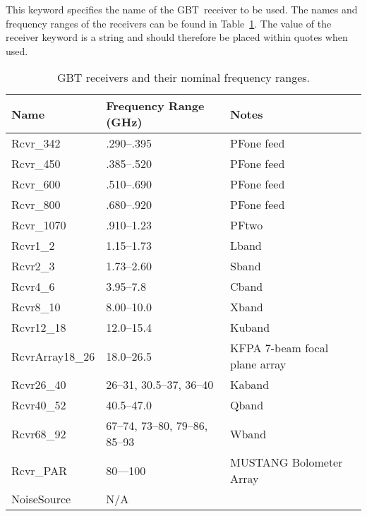\begin{description}[leftmargin=*,font=\bfseries\large]

\item[receiver] This keyword specifies the  name of the \gls{GBT}\ receiver to be used.
The names and frequency ranges of the receivers can be found in Table~\ref{table:rx}.
The value of the receiver keyword is a string and should therefore be placed within
quotes when used.

\begin{table}[!h]
\begin{center}
\setlength{\abovecaptionskip}{0pt}\setlength{\belowcaptionskip}{0pt}
\caption[GBT receivers and frequencies]
{\gls{GBT} receivers and their nominal frequency ranges.
\label{table:rx}}
\begin{tabular}{lll}
\toprule
Name    & Frequency Range (GHz) & Notes             \\
\midrule
Rcvr\_342       &   .290--.395  & \gls{PFone} feed\\
Rcvr\_450       &   .385--.520  & \gls{PFone} feed\\
Rcvr\_600       &   .510--.690  & \gls{PFone} feed\\
\midrule
Rcvr\_800       &   .680--.920  & \gls{PFone} feed\\
Rcvr\_1070      &   .910--1.23  & \gls{PFtwo}         \\
Rcvr1\_2        &   1.15--1.73  & \gls{Lband}       \\
\midrule
Rcvr2\_3        &   1.73--2.60  & \gls{Sband}       \\
Rcvr4\_6        &   3.95--7.8   & \gls{Cband}       \\
Rcvr8\_10       &   8.00--10.0  & \gls{Xband}       \\
\midrule
Rcvr12\_18      &   12.0--15.4  & \gls{Kuband}      \\
RcvrArray18\_26 & 18.0--26.5    & \gls{KFPA} 7-beam focal plane array \\
Rcvr26\_40      &  26--31, 30.5--37, 36--40 & \gls{Kaband} \\
\midrule
Rcvr40\_52      &   40.5--47.0  & \gls{Qband} \\
Rcvr68\_92      & 67--74, 73--80, 79--86, 85--93 & \gls{Wband} \\
Rcvr\_PAR       & 80---100 & \gls{MUSTANG} Bolometer Array\\
NoiseSource     &  N/A & \\
\bottomrule
\end{tabular}
\end{center}
\end{table}


\end{description}
